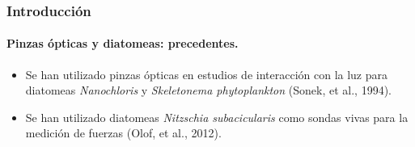 \documentclass[10pt,aspectratio=1610,compress,dvipsnames]{beamer}
\begin{document}
\begin{frame}\frametitle{Introducción}
\framesubtitle{Pinzas ópticas y diatomeas: precedentes.}
\begin{itemize}
	\item Se han utilizado pinzas \'opticas en estudios de interacci\'on con la luz para diatomeas \textit{Nanochloris} y \textit{Skeletonema phytoplankton} (Sonek, et al., 1994). 
	\item Se han utilizado diatomeas \textit{Nitzschia subacicularis} como sondas vivas para la medici\'on de fuerzas (Olof, et al., 2012).
\end{itemize}


\end{frame}



\end{document}
